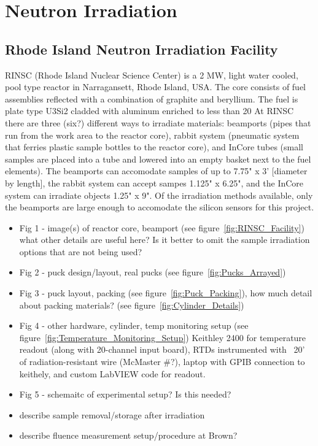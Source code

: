 \section{Neutron Irradiation}
\label{sec:irradiation}

\subsection{Rhode Island Neutron Irradiation Facility}
\label{subsec:RINSC}
RINSC (Rhode Island Nuclear Science Center) is a 2 MW, light water cooled, pool type reactor in Narragansett, Rhode Island, USA.
The core consists of fuel assemblies reflected with a combination of graphite and beryllium.
The fuel is plate type U3Si2 cladded with aluminum enriched to less than 20%
At RINSC there are three (six?) different ways to irradiate materials: beamports (pipes that run from the work area to the reactor core), rabbit system (pneumatic system that ferries plastic sample bottles to the reactor core), and InCore tubes (small samples are placed into a tube and lowered into an empty basket next to the fuel elements). 
The beamports can accomodate samples of up to 7.75" x 3' [diameter by length], the rabbit system can accept sampes 1.125" x 6.25", and the InCore system can irradiate objects 1.25" x 9". 
Of the irradiation methods available, only the beamports are large enough to accomodate the silicon sensors for this project.
\begin{itemize}
    \item Fig 1 - image(s) of reactor core, beamport (see figure~\ref{fig:RINSC_Facility})
    what other details are useful here?
    Is it better to omit the sample irradiation options that are not being used?
    \item Fig 2 - puck design/layout, real pucks (see figure~\ref{fig:Pucks_Arrayed})
    \item Fig 3 - puck layout, packing (see figure~\ref{fig:Puck_Packing}), how much detail about packing materials? (see figure~\ref{fig:Cylinder_Details})
    \item Fig 4 - other hardware, cylinder, temp monitoring setup (see figure~\ref{fig:Temperature_Monitoring_Setup})
    Keithley 2400 for temperature readout (along with 20-channel input board), RTDs instrumented with ~20' of radiation-resistant wire (McMaster #?), laptop with GPIB connection to keithely, and custom LabVIEW code for readout.
    \item Fig 5 - schemaitc of experimental setup? Is this needed?
    \item describe sample removal/storage after irradiation
    \item describe fluence measurement setup/procedure at Brown? 
\end{itemize}

